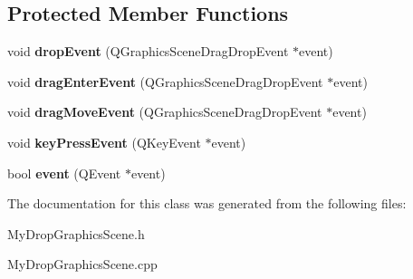 \subsection*{Protected Member Functions}
\begin{DoxyCompactItemize}
\item 
\hypertarget{class_my_drop_graphics_scene_a1a5dd8b0ac8aa55645d1d8c919451350}{}void {\bfseries drop\+Event} (Q\+Graphics\+Scene\+Drag\+Drop\+Event $\ast$event)\label{class_my_drop_graphics_scene_a1a5dd8b0ac8aa55645d1d8c919451350}

\item 
\hypertarget{class_my_drop_graphics_scene_a050aa1d5a7861ad4f320da82219a63d2}{}void {\bfseries drag\+Enter\+Event} (Q\+Graphics\+Scene\+Drag\+Drop\+Event $\ast$event)\label{class_my_drop_graphics_scene_a050aa1d5a7861ad4f320da82219a63d2}

\item 
\hypertarget{class_my_drop_graphics_scene_a407f26d50aa080e00f1097ffee0f41ce}{}void {\bfseries drag\+Move\+Event} (Q\+Graphics\+Scene\+Drag\+Drop\+Event $\ast$event)\label{class_my_drop_graphics_scene_a407f26d50aa080e00f1097ffee0f41ce}

\item 
\hypertarget{class_my_drop_graphics_scene_a856ec4eddc556b20abf3831b0ca3910a}{}void {\bfseries key\+Press\+Event} (Q\+Key\+Event $\ast$event)\label{class_my_drop_graphics_scene_a856ec4eddc556b20abf3831b0ca3910a}

\item 
\hypertarget{class_my_drop_graphics_scene_af8d211f3518dcc347f80eaebfee8a09a}{}bool {\bfseries event} (Q\+Event $\ast$event)\label{class_my_drop_graphics_scene_af8d211f3518dcc347f80eaebfee8a09a}

\end{DoxyCompactItemize}


The documentation for this class was generated from the following files\+:\begin{DoxyCompactItemize}
\item 
My\+Drop\+Graphics\+Scene.\+h\item 
My\+Drop\+Graphics\+Scene.\+cpp\end{DoxyCompactItemize}
